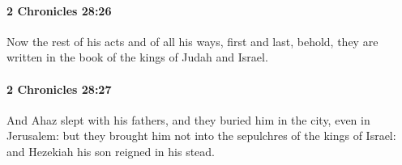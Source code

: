 		\paragraph{2 Chronicles 28:26} %
			\label{2CHRONICLES-28-26}

			Now the rest of his acts and of all his ways, first and last, behold, they are written in the book of the kings of Judah and Israel.


		\paragraph{2 Chronicles 28:27} %
			\label{2CHRONICLES-28-27}

			And Ahaz slept with his fathers, and they buried him in the city, even in Jerusalem: but they brought him not into the sepulchres of the kings of Israel: and Hezekiah his son reigned in his stead.

